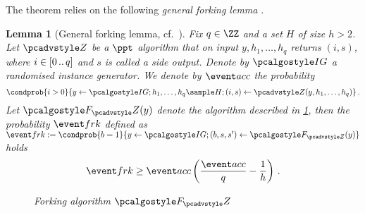 \documentclass[runningheads,11pt]{llncs}
\newtheorem{lemma}[theorem]{Lemma} \newtheorem{corollary}[theorem]{Corollary}
\theoremstyle{definition} \newtheorem{definition}[theorem]{Definition}
\begin{document}
The theorem relies on the following \emph{general forking lemma} \cite{JC:PoiSte00}.

\begin{lemma}[General forking lemma, cf.~\cite{INDOCRYPT:FKMV12,CCS:BelNev06}]
	\label{lem:forking_lemma}
	Fix $q \in \ZZ$ and a set $H$ of size $h > 2$. Let $\zdv$ be a $\ppt$
  algorithm that on input $y, h_1, \ldots, h_q$ returns $(i, s)$, where $i
  \in[0 \, .. \, q]$ and $s$ is called a \emph{side output}. Denote by $\ig$ a
  randomised instance generator. We denote by $\accProb$ the probability
	\[
		\condprob{i > 0}{y \gets \ig; h_1, \ldots, h_q \sample H; (i, s) \gets
		\zdv(y, h_1, \ldots, h_q)}\,.
	\]
	Let $\forking_\zdv(y)$ denote the algorithm described in
  \cref{fig:forking_lemma}, then the probability $\frkProb$ defined as $
  \frkProb := \condprob{b = 1}{y \gets \ig; (b, s, s') \gets \forking_{\zdv}(y)}
  $ holds
	\[
		\frkProb \geq \accProb \brak{\frac{\accProb}{q} - \frac{1}{h}}\,.
	\]
	\begin{figure}[t]
		\centering
		\caption{Forking algorithm $\forking_\zdv$}
		\label{fig:forking_lemma}
\end{figure}
\end{lemma}
\end{document}
